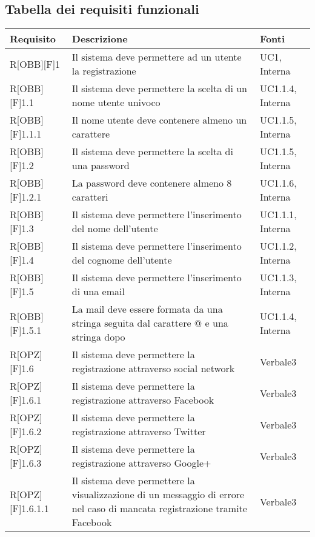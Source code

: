 \subsection{Tabella dei requisiti funzionali}
	\begin{table}[h]
		\begin{tabular}{|p{}|p{}|p{}|}
			\toprule
			
			\textbf{Requisito} & \textbf{Descrizione} & \textbf{Fonti} \\
			
			\midrule

R[OBB][F]1 & Il sistema deve permettere ad un utente la registrazione & UC1, Interna \\ \midrule
R[OBB][F]1.1 & Il sistema deve permettere la scelta di un nome utente univoco & UC1.1.4, Interna \\ \midrule
R[OBB][F]1.1.1 & Il nome utente deve contenere almeno un carattere & UC1.1.5, Interna \\ \midrule
R[OBB][F]1.2 & Il sistema deve permettere la scelta di una password & UC1.1.5, Interna \\ \midrule
R[OBB][F]1.2.1 & La password deve contenere almeno 8 caratteri & UC1.1.6, Interna \\ \midrule
R[OBB][F]1.3 & Il sistema deve permettere l'inserimento del nome dell'utente & UC1.1.1, Interna \\ \midrule
R[OBB][F]1.4 & Il sistema deve permettere l'inserimento del cognome dell'utente & UC1.1.2, Interna \\ \midrule
R[OBB][F]1.5 & Il sistema deve permettere l'inserimento di una email & UC1.1.3, Interna \\ \midrule
R[OBB][F]1.5.1 & La mail deve essere formata da una stringa seguita dal carattere @ e una stringa dopo & UC1.1.4, Interna \\ \midrule
R[OPZ][F]1.6 & Il sistema deve permettere la registrazione attraverso social network & Verbale3 \\ \midrule
R[OPZ][F]1.6.1 & Il sistema deve permettere la registrazione attraverso Facebook & Verbale3 \\ \midrule
R[OPZ][F]1.6.2 & Il sistema deve permettere la registrazione attraverso Twitter & Verbale3 \\ \midrule
R[OPZ][F]1.6.3 & Il sistema deve permettere la registrazione attraverso Google+ & Verbale3 \\ \midrule
R[OPZ][F]1.6.1.1 & Il sistema deve permettere la visualizzazione di un messaggio di errore nel caso di mancata registrazione tramite Facebook & Verbale3 \\ \midrule

\end{tabular}
\end{table}
